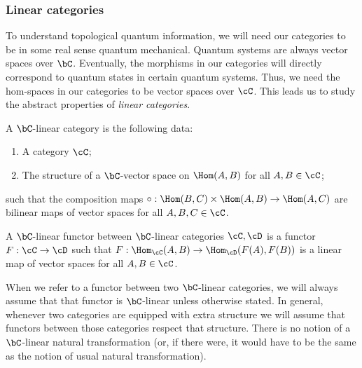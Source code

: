 
\subsubsection{Linear categories}


To understand topological quantum information, we will need our categories to be in some real sense quantum mechanical. Quantum systems are always vector spaces over $\bC$. Eventually, the morphisms in our categories will directly correspond to quantum states in certain quantum systems. Thus, we need the hom-spaces in our categories to be vector spaces over $\cC$. This leads us to study the abstract properties of {\em linear categories}.

\begin{defn} A $\bC$-linear category is the following data:

\begin{enumerate}
\item A category $\cC$;
\item The structure of a $\bC$-vector space on $\Hom(A,B)$ for all $A,B\in \cC$;

\end{enumerate}

such that the composition maps $\circ:\Hom(B,C)\times \Hom(A,B)\to \Hom(A,C)$ are bilinear maps of vector spaces for all $A,B,C\in \cC$.
\end{defn}

\begin{defn} A $\bC$-linear functor between $\bC$-linear categories $\cC,\cD$ is a functor $F:\cC\to\cD$ such that $F:\Hom_\cC(A,B)\to\Hom_\cD(F(A),F(B))$ is a linear map of vector spaces for all $A,B\in\cC$.
\end{defn}

\begin{rem} When we refer to a functor between two $\bC$-linear categories, we will always assume that that functor is $\bC$-linear unless otherwise stated. In general, whenever two categories are equipped with extra structure we will assume that functors between those categories respect that structure. There is no notion of a $\bC$-linear natural transformation (or, if there were, it would have to be the same as the notion of usual natural transformation).
\end{rem}

